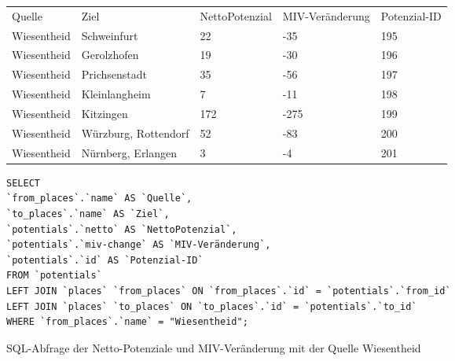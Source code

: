 \begin{tabularx}{\textwidth}{*5{X}}
Quelle & Ziel & NettoPotenzial & MIV-Veränderung & Potenzial-ID\\ 
Wiesentheid & Schweinfurt & 22 & -35 & 195\\ 
Wiesentheid & Gerolzhofen & 19 & -30 & 196\\ 
Wiesentheid & Prichsenstadt & 35 & -56 & 197\\ 
Wiesentheid & Kleinlangheim & 7 & -11 & 198\\ 
Wiesentheid & Kitzingen & 172 & -275 & 199\\ 
Wiesentheid & Würzburg, Rottendorf & 52 & -83 & 200\\ 
Wiesentheid & Nürnberg, Erlangen & 3 & -4 & 201\\ 
\end{tabularx}    
\newline
\newline
\begin{listing}[htbp]
\begin{verbatim}
SELECT
`from_places`.`name` AS `Quelle`, 
`to_places`.`name` AS `Ziel`, 
`potentials`.`netto` AS `NettoPotenzial`, 
`potentials`.`miv-change` AS `MIV-Veränderung`, 
`potentials`.`id` AS `Potenzial-ID`
FROM `potentials`
LEFT JOIN `places` `from_places` ON `from_places`.`id` = `potentials`.`from_id`
LEFT JOIN `places` `to_places` ON `to_places`.`id` = `potentials`.`to_id`
WHERE `from_places`.`name` = "Wiesentheid";
\end{verbatim}
\caption{SQL-Abfrage der Netto-Potenziale und MIV-Veränderung mit der Quelle Wiesentheid}\label{lst-fz-wiesentheid}
\end{listing}